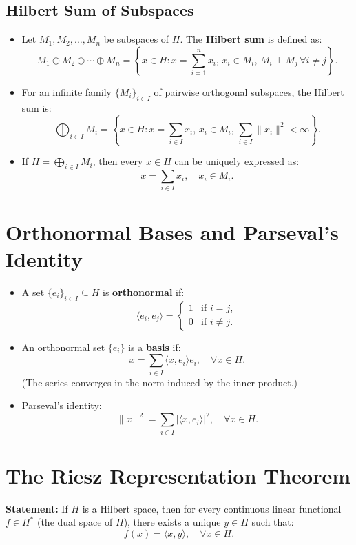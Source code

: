 \documentclass{article}
\begin{document}
\subsection*{Hilbert Sum of Subspaces}
\begin{itemize}
    \item Let \( M_1, M_2, \dots, M_n \) be subspaces of \( H \). The \textbf{Hilbert sum} is defined as:
    \[
    M_1 \oplus M_2 \oplus \cdots \oplus M_n = \left\{ x \in H : x = \sum_{i=1}^n x_i, \, x_i \in M_i, \, M_i \perp M_j \, \forall i \neq j \right\}.
    \]
    \item For an infinite family \( \{M_i\}_{i \in I} \) of pairwise orthogonal subspaces, the Hilbert sum is:
    \[
    \bigoplus_{i \in I} M_i = \left\{ x \in H : x = \sum_{i \in I} x_i, \, x_i \in M_i, \, \sum_{i \in I} \|x_i\|^2 < \infty \right\}.
    \]
    \item If \( H = \bigoplus_{i \in I} M_i \), then every \( x \in H \) can be uniquely expressed as:
    \[
    x = \sum_{i \in I} x_i, \quad x_i \in M_i.
    \]
\end{itemize}

\section{Orthonormal Bases and Parseval's Identity}
\begin{itemize}
    \item A set \( \{e_i\}_{i \in I} \subseteq H \) is \textbf{orthonormal} if:
    \[
    \langle e_i, e_j \rangle = 
    \begin{cases} 
    1 & \text{if } i = j, \\
    0 & \text{if } i \neq j.
    \end{cases}
    \]
    \item An orthonormal set \( \{e_i\} \) is a \textbf{basis} if:
    \[
    x = \sum_{i \in I} \langle x, e_i \rangle e_i, \quad \forall x \in H.
    \]
    (The series converges in the norm induced by the inner product.)
    \item Parseval's identity:
    \[
    \|x\|^2 = \sum_{i \in I} |\langle x, e_i \rangle|^2, \quad \forall x \in H.
    \]
\end{itemize}

\section{The Riesz Representation Theorem}
\textbf{Statement:} If \( H \) is a Hilbert space, then for every continuous linear functional \( f \in H^* \) (the dual space of \( H \)), there exists a unique \( y \in H \) such that:
\[
f(x) = \langle x, y \rangle, \quad \forall x \in H.
\]
\end{document}
